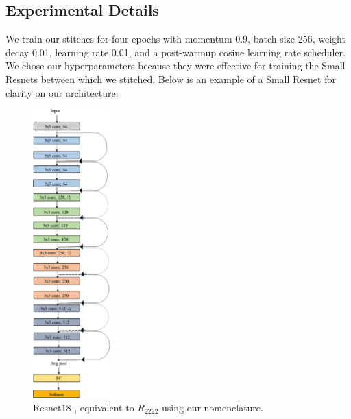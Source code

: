 \documentclass{article}
\begin{document}
\subsection*{Experimental Details}
We train our stitches for four epochs with momentum 0.9,
batch size 256, weight decay 0.01, learning rate 0.01, and 
a post-warmup cosine learning rate scheduler. We chose our
hyperparameters because they were effective for training the
Small Resnets between which we stitched. Below is an example of
a Small Resnet for clarity on our architecture.
\begin{center}
  \begin{figure}[H]
     \centering
     \includegraphics[width=3cm]{resnet18-arch.png}
     \caption{Resnet18 \cite{He2016DeepRL}, equivalent to $R_{2222}$
     using our nomenclature.}
  \end{figure}
\end{center}
\end{document}
